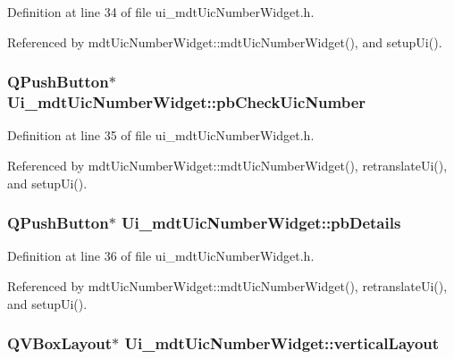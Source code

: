 Definition at line 34 of file ui\-\_\-mdt\-Uic\-Number\-Widget.\-h.



Referenced by mdt\-Uic\-Number\-Widget\-::mdt\-Uic\-Number\-Widget(), and setup\-Ui().

\hypertarget{class_ui__mdt_uic_number_widget_a8c26e34387eef6c24ab5193b020816b7}{
\subsubsection[{pb\-Check\-Uic\-Number}]{\setlength{\rightskip}{0pt plus 5cm}Q\-Push\-Button$\ast$ Ui\-\_\-mdt\-Uic\-Number\-Widget\-::pb\-Check\-Uic\-Number}}\label{class_ui__mdt_uic_number_widget_a8c26e34387eef6c24ab5193b020816b7}


Definition at line 35 of file ui\-\_\-mdt\-Uic\-Number\-Widget.\-h.



Referenced by mdt\-Uic\-Number\-Widget\-::mdt\-Uic\-Number\-Widget(), retranslate\-Ui(), and setup\-Ui().

\hypertarget{class_ui__mdt_uic_number_widget_ae6bdc7333828a55a945984bc456768fc}{
\subsubsection[{pb\-Details}]{\setlength{\rightskip}{0pt plus 5cm}Q\-Push\-Button$\ast$ Ui\-\_\-mdt\-Uic\-Number\-Widget\-::pb\-Details}}\label{class_ui__mdt_uic_number_widget_ae6bdc7333828a55a945984bc456768fc}


Definition at line 36 of file ui\-\_\-mdt\-Uic\-Number\-Widget.\-h.



Referenced by mdt\-Uic\-Number\-Widget\-::mdt\-Uic\-Number\-Widget(), retranslate\-Ui(), and setup\-Ui().

\hypertarget{class_ui__mdt_uic_number_widget_ae4f4014f77661ccd79e805d2e17b4276}{
\subsubsection[{vertical\-Layout}]{\setlength{\rightskip}{0pt plus 5cm}Q\-V\-Box\-Layout$\ast$ Ui\-\_\-mdt\-Uic\-Number\-Widget\-::vertical\-Layout}}\label{class_ui__mdt_uic_number_widget_ae4f4014f77661ccd79e805d2e17b4276}


